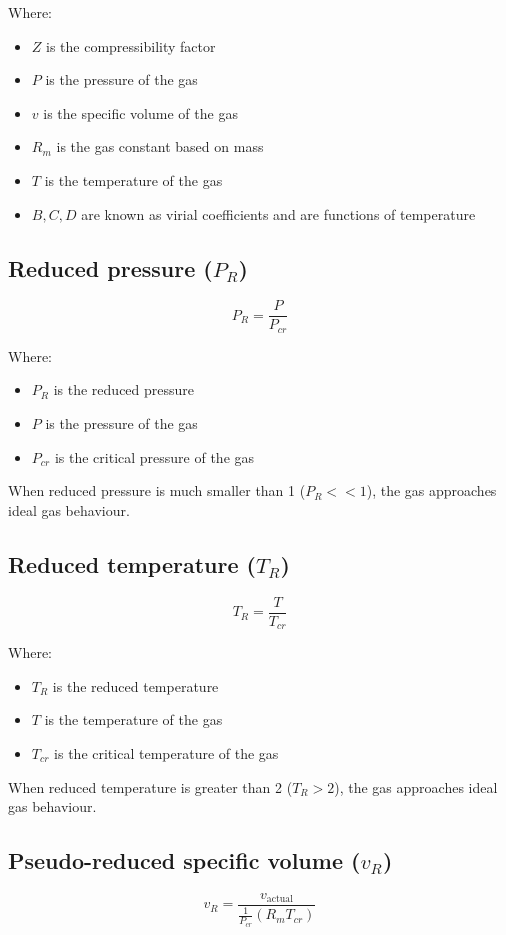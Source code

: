 \documentclass[11pt]{article}
\begin{document}
Where:
\begin{itemize}
\item \(Z\) is the compressibility factor
\item \(P\) is the pressure of the gas
\item \(v\) is the specific volume of the gas
\item \(R_m\) is the gas constant based on mass
\item \(T\) is the temperature of the gas
\item \(B, C, D\) are known as virial coefficients and are functions of temperature
\end{itemize}

\subsection{Reduced pressure (\(P_R\))}
\label{sec:org9218e86}
\[P_R = \frac{P}{P_{cr}}\]

Where:
\begin{itemize}
\item \(P_R\) is the reduced pressure
\item \(P\) is the pressure of the gas
\item \(P_{cr}\) is the critical pressure of the gas
\end{itemize}

When reduced pressure is much smaller than 1 (\(P_R << 1\)), the gas approaches ideal gas behaviour.

\subsection{Reduced temperature (\(T_R\))}
\label{sec:org2bf10a5}
\[T_R = \frac{T}{T_{cr}}\]

Where:
\begin{itemize}
\item \(T_R\) is the reduced temperature
\item \(T\) is the temperature of the gas
\item \(T_{cr}\) is the critical temperature of the gas
\end{itemize}

When reduced temperature is greater than 2 (\(T_R > 2\)), the gas approaches ideal gas behaviour.

\subsection{Pseudo-reduced specific volume (\(v_R\))}
\label{sec:orgf00c1e7}
\[v_R = \frac{v_{\text{actual}}}{\frac{1}{P_{cr}} \left(R_m T_{cr} \right)}\]
\end{document}

